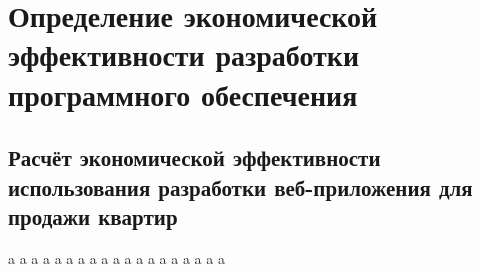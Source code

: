 \newcommand{\byr}{Br}

\section{Определение экономической эффективности разработки программного обеспечения}

\subsection{Расчёт экономической эффективности использования разработки веб-приложения для продажи квартир}

\newpage
a
\newpage
a
\newpage
a
\newpage
a
\newpage
a
\newpage
a
\newpage
a
\newpage
a
\newpage
a
\newpage
a
\newpage
a
\newpage
a
\newpage
a
\newpage
a
\newpage
a
\newpage
a
\newpage
a
\newpage
a
\newpage
a
\newpage